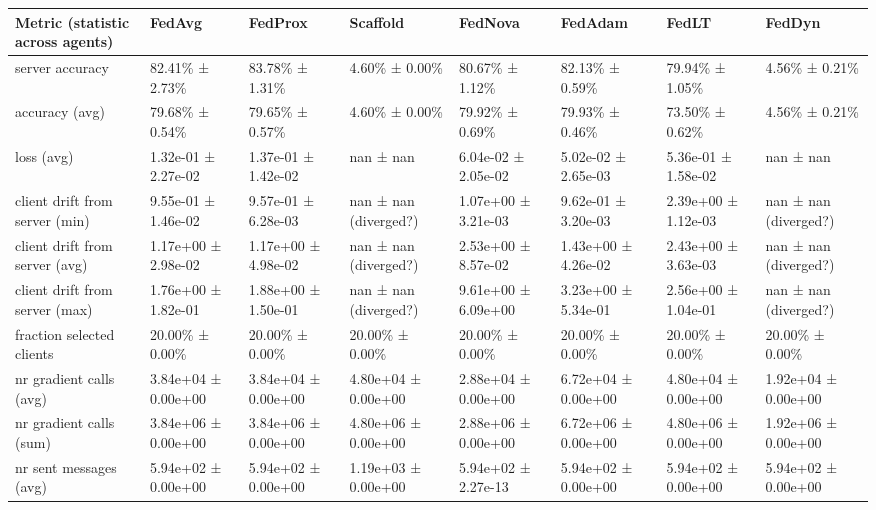 \begin{tabular}{llllllll}
\hline
 Metric (statistic across agents)   & FedAvg              & FedProx             & Scaffold              & FedNova             & FedAdam             & FedLT               & FedDyn                \\
\hline
 server accuracy                    & 82.41\% ± 2.73\%      & 83.78\% ± 1.31\%      & 4.60\% ± 0.00\%         & 80.67\% ± 1.12\%      & 82.13\% ± 0.59\%      & 79.94\% ± 1.05\%      & 4.56\% ± 0.21\%         \\
 accuracy (avg)                     & 79.68\% ± 0.54\%      & 79.65\% ± 0.57\%      & 4.60\% ± 0.00\%         & 79.92\% ± 0.69\%      & 79.93\% ± 0.46\%      & 73.50\% ± 0.62\%      & 4.56\% ± 0.21\%         \\
 loss (avg)                         & 1.32e-01 ± 2.27e-02 & 1.37e-01 ± 1.42e-02 & nan ± nan             & 6.04e-02 ± 2.05e-02 & 5.02e-02 ± 2.65e-03 & 5.36e-01 ± 1.58e-02 & nan ± nan             \\
 client drift from server (min)     & 9.55e-01 ± 1.46e-02 & 9.57e-01 ± 6.28e-03 & nan ± nan (diverged?) & 1.07e+00 ± 3.21e-03 & 9.62e-01 ± 3.20e-03 & 2.39e+00 ± 1.12e-03 & nan ± nan (diverged?) \\
 client drift from server (avg)     & 1.17e+00 ± 2.98e-02 & 1.17e+00 ± 4.98e-02 & nan ± nan (diverged?) & 2.53e+00 ± 8.57e-02 & 1.43e+00 ± 4.26e-02 & 2.43e+00 ± 3.63e-03 & nan ± nan (diverged?) \\
 client drift from server (max)     & 1.76e+00 ± 1.82e-01 & 1.88e+00 ± 1.50e-01 & nan ± nan (diverged?) & 9.61e+00 ± 6.09e+00 & 3.23e+00 ± 5.34e-01 & 2.56e+00 ± 1.04e-01 & nan ± nan (diverged?) \\
 fraction selected clients          & 20.00\% ± 0.00\%      & 20.00\% ± 0.00\%      & 20.00\% ± 0.00\%        & 20.00\% ± 0.00\%      & 20.00\% ± 0.00\%      & 20.00\% ± 0.00\%      & 20.00\% ± 0.00\%        \\
 nr gradient calls (avg)            & 3.84e+04 ± 0.00e+00 & 3.84e+04 ± 0.00e+00 & 4.80e+04 ± 0.00e+00   & 2.88e+04 ± 0.00e+00 & 6.72e+04 ± 0.00e+00 & 4.80e+04 ± 0.00e+00 & 1.92e+04 ± 0.00e+00   \\
 nr gradient calls (sum)            & 3.84e+06 ± 0.00e+00 & 3.84e+06 ± 0.00e+00 & 4.80e+06 ± 0.00e+00   & 2.88e+06 ± 0.00e+00 & 6.72e+06 ± 0.00e+00 & 4.80e+06 ± 0.00e+00 & 1.92e+06 ± 0.00e+00   \\
 nr sent messages (avg)             & 5.94e+02 ± 0.00e+00 & 5.94e+02 ± 0.00e+00 & 1.19e+03 ± 0.00e+00   & 5.94e+02 ± 2.27e-13 & 5.94e+02 ± 0.00e+00 & 5.94e+02 ± 0.00e+00 & 5.94e+02 ± 0.00e+00   \\

\end{tabular}
